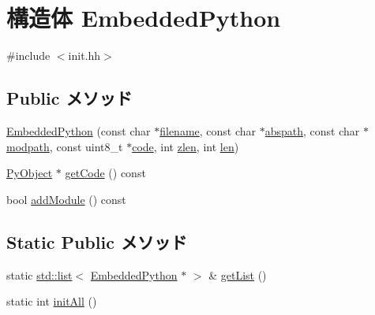 \hypertarget{structEmbeddedPython}{
\section{構造体 EmbeddedPython}
\label{structEmbeddedPython}
}


{\ttfamily \#include $<$init.hh$>$}\subsection*{Public メソッド}
\begin{DoxyCompactItemize}
\item 
\hyperlink{structEmbeddedPython_a8690d24139e438be597d431ff246f6cc}{EmbeddedPython} (const char $\ast$\hyperlink{structEmbeddedPython_a7efa5e9c7494c7d4586359300221aa5d}{filename}, const char $\ast$\hyperlink{structEmbeddedPython_a7e37ebe634a47d707d33b62f3afa2e6f}{abspath}, const char $\ast$\hyperlink{structEmbeddedPython_adb35c720a17cc1108823c3bf5591d4e1}{modpath}, const uint8\_\-t $\ast$\hyperlink{structEmbeddedPython_a5588144d84c4c0c07d52c2f1dfebfa4f}{code}, int \hyperlink{structEmbeddedPython_a0dbae0464f702cabe3fca2905e9f5558}{zlen}, int \hyperlink{structEmbeddedPython_afed088663f8704004425cdae2120b9b3}{len})
\item 
\hyperlink{init_8hh_ae19630c1f4ca6d5236b30719d9140013}{PyObject} $\ast$ \hyperlink{structEmbeddedPython_ae39ff8f9293c5a762fc81e30a0db5ec9}{getCode} () const 
\item 
bool \hyperlink{structEmbeddedPython_afc01d2558f51232482f1c577efafa327}{addModule} () const 
\end{DoxyCompactItemize}
\subsection*{Static Public メソッド}
\begin{DoxyCompactItemize}
\item 
static \hyperlink{classstd_1_1list}{std::list}$<$ \hyperlink{structEmbeddedPython}{EmbeddedPython} $\ast$ $>$ \& \hyperlink{structEmbeddedPython_abf218b62a208b466b069e15e3afe8dae}{getList} ()
\item 
static int \hyperlink{structEmbeddedPython_a545809966798dc7f72af9335fd61da31}{initAll} ()
\end{DoxyCompactItemize}
